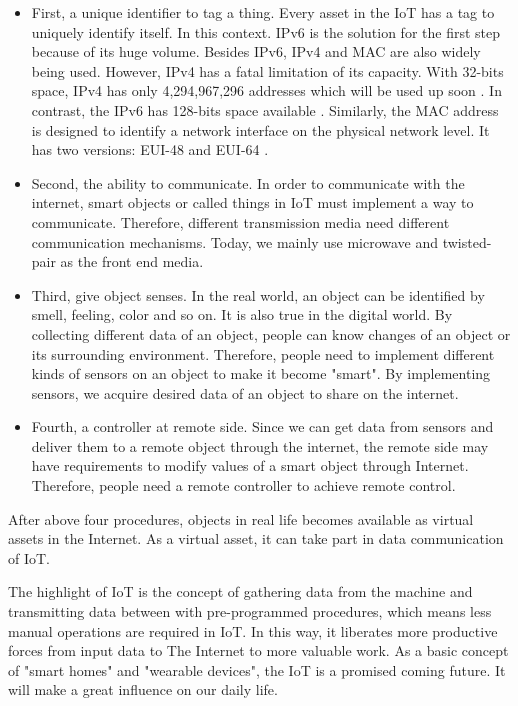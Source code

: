 \documentclass{Nan_Thesis}
\begin{document}
\begin{itemize}
  \item First, a unique identifier to tag a thing. Every asset in the IoT has a tag to uniquely identify itself. In this context. IPv6 is the solution for the first step because of its huge volume. Besides IPv6, IPv4 and MAC are also widely being used. However, IPv4 has a fatal limitation of its capacity. With 32-bits space, IPv4 has only 4,294,967,296 addresses which will be used up soon \cite{parkhurst2004routing}. In contrast, the IPv6 has 128-bits space available \cite{parkhurst2004routing}. Similarly, the MAC address is designed to identify a network interface on the physical network level. It has two versions: EUI-48 \cite{guildlinefor48mac2016IEEE} and EUI-64 \cite{guildlinefor64mac2016IEEE}.
  \item Second, the ability to communicate. In order to communicate with the internet, smart objects or called things in IoT must implement a way to communicate. Therefore, different transmission media need different communication mechanisms. Today, we mainly use microwave and twisted-pair as the front end media.
  \item Third, give object senses. In the real world, an object can be identified by smell, feeling, color and so on. It is also true in the digital world. By collecting different data of an object, people can know changes of an object or its surrounding environment. Therefore, people need to implement different kinds of sensors on an object to make it become "smart". By implementing sensors, we acquire desired data of an object to share on the internet.
  \item Fourth, a controller at remote side. Since we can get data from sensors and deliver them to a remote object through the internet, the remote side may have requirements to modify values of a smart object through Internet. Therefore, people need a remote controller to achieve remote control.
\end{itemize}

After above four procedures, objects in real life becomes available as virtual assets in the Internet. As a virtual asset, it can take part in data communication of IoT.

The highlight of IoT is the concept of gathering data from the machine and transmitting data between with pre-programmed procedures, which means less manual operations are required in IoT. In this way, it liberates more productive forces from input data to The Internet to more valuable work. As a basic concept of "smart homes" and "wearable devices", the IoT is a promised coming future. It will make a great influence on our daily life.
\end{document}
